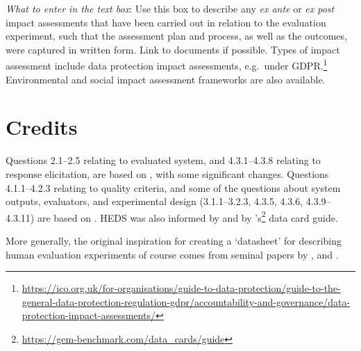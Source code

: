 \documentclass[11pt,a4paper]{article}
\begin{document}
\noindent\textit{What to enter in the text box}: Use this box to describe any \textit{ex ante} or \textit{ex post} impact assessments that have been carried out in relation to the evaluation experiment, such that the assessment plan and process, as well as the outcomes, were captured in written form. Link to documents if possible. Types of impact assessment include data protection impact assessments, e.g.\ under GDPR.\footnote{\footnotesize \url{https://ico.org.uk/for-organisations/guide-to-data-protection/guide-to-the-general-data-protection-regulation-gdpr/accountability-and-governance/data-protection-impact-assessments/}} Environmental and social impact assessment frameworks are also available.


\section*{Credits}

Questions 2.1--2.5 relating to evaluated system, and 4.3.1--4.3.8 relating to response elicitation, are based on \citet{howcroft-etal-2020-twenty}, with some significant changes. Questions 4.1.1--4.2.3 relating to quality criteria, and some of the questions about system outputs, evaluators, and experimental design (3.1.1--3.2.3, 4.3.5, 4.3.6, 4.3.9--4.3.11) are based on \citet{belz-etal-2020-disentangling}. 
HEDS was also informed by \citet{van2019best, vanderlee2021} and by  \citet{gehrmann2021gem}'s\footnote{\footnotesize \url{https://gem-benchmark.com/data\_cards/guide}} data card guide.

More generally, the original inspiration for creating a `datasheet' for describing human evaluation experiments of course comes from seminal papers by \citet{bender-friedman-2018-data}, \citet{mitchell2019modelcards} and \citet{gebru2018datasheets}.



\end{document}

